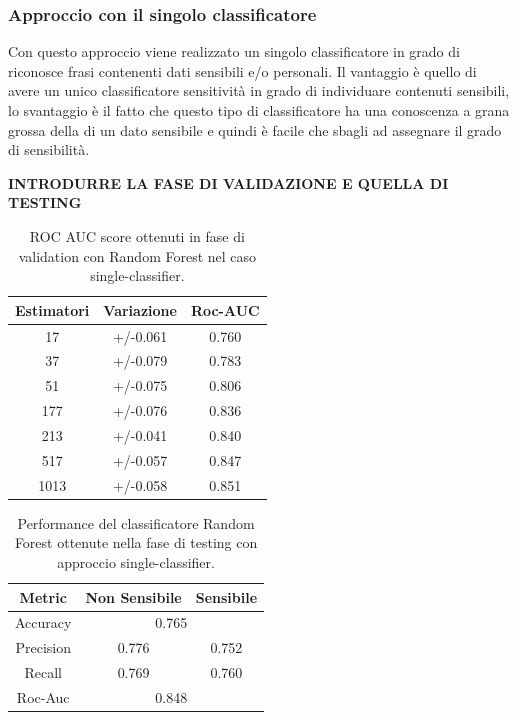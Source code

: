 \subsubsection{Approccio con il singolo classificatore}
\label{sssec:singleclass}
Con questo approccio viene realizzato un singolo classificatore in grado di riconosce frasi contenenti dati sensibili e/o personali. Il vantaggio è quello di avere un unico classificatore sensitività in grado di individuare contenuti sensibili, lo svantaggio è il fatto che questo tipo di classificatore ha una conoscenza a grana grossa della di un dato sensibile e quindi è facile che sbagli ad assegnare il grado di sensibilità.

\textbf{INTRODURRE LA FASE DI VALIDAZIONE E QUELLA DI TESTING} 
\begin{table}[h]
\label{tbl:validation_sens}
\centering
\begin{tabular}{|c|c|c|}
\hline
\textbf{Estimatori} & \textbf{Variazione} & \textbf{Roc-AUC} \\ \hline
17 & +/-0.061 & 0.760 \\ \hline
37 & +/-0.079 & 0.783 \\ \hline
51 & +/-0.075 & 0.806 \\ \hline
177 & +/-0.076 & 0.836 \\ \hline
213 & +/-0.041 & 0.840 \\ \hline
517 & +/-0.057 & 0.847 \\ \hline
1013 & +/-0.058 & 0.851 \\ \hline
\end{tabular}
\caption{ROC AUC score ottenuti in fase di validation con Random Forest nel caso single-classifier.}
\end{table}
\FloatBarrier

\begin{table}[h]
\label{tbl:training_sens}
\centering
\begin{tabular}{|c|c|c|}
\hline
\textbf{Metric} & \textbf{Non Sensibile} & \textbf{Sensibile} \\ \hline
Accuracy & \multicolumn{2}{c|}{0.765} \\ \hline
Precision & 0.776 & 0.752 \\ \hline
Recall & 0.769 & 0.760 \\ \hline
Roc-Auc & \multicolumn{2}{c|}{0.848} \\ \hline
\end{tabular}
\caption{Performance del classificatore Random Forest ottenute nella fase di testing con approccio single-classifier.}
\end{table}
\FloatBarrier

